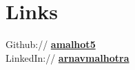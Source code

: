 \documentclass[a4paper]{deedy-resume-openfont} %
\begin{document}
\begin{minipage}[t]{0.33\textwidth}


\section{Links} 

Github:// \href{https://github.com/amalhot5}{\bf amalhot5} \\
LinkedIn:// \href{https://www.linkedin.com/in/arnavmalhotra}{\bf arnavmalhotra} 
\sectionsep


\end{minipage} %
\hfill
%
%
\end{document}
